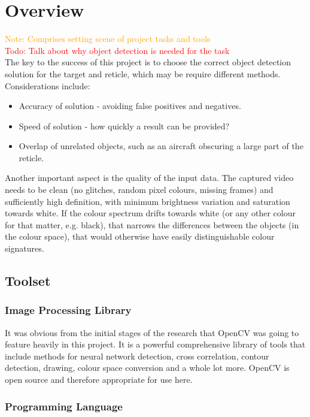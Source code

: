 \documentclass[final]{cmpreport_02}
\begin{document}
\section{Overview}

\textcolor{orange}{Note: Comprises setting scene of project tasks and tools}\\
\textcolor{red}{Todo: Talk about why object detection is needed for the task}\\

The key to the success of this project is to choose the correct object detection solution for the target and reticle, which may be require different methods. Considerations include:

\begin{itemize}
	\item Accuracy of solution - avoiding false positives and negatives.
	\item Speed of solution - how quickly a result can be provided?
	\item Overlap of unrelated objects, such as an aircraft obscuring a large part of the reticle.
\end{itemize}
\noindent
Another important aspect is the quality of the input data. The captured video needs to be clean (no glitches, random pixel colours, missing frames) and sufficiently high definition, with minimum brightness variation and saturation towards white. If the colour spectrum drifts towards white (or any other colour for that matter, e.g. black), that narrows the differences between the objects (in the colour space), that would otherwise have easily distinguishable colour signatures.

\subsection{Toolset}

\subsubsection{Image Processing Library}

It was obvious from the initial stages of the research that OpenCV was going to feature heavily in this project. It is a powerful comprehensive library of tools that include methods for neural network detection, cross correlation, contour detection, drawing, colour space conversion and a whole lot more. OpenCV is open source and therefore appropriate for use here.

\subsubsection{Programming Language}
\end{document}
